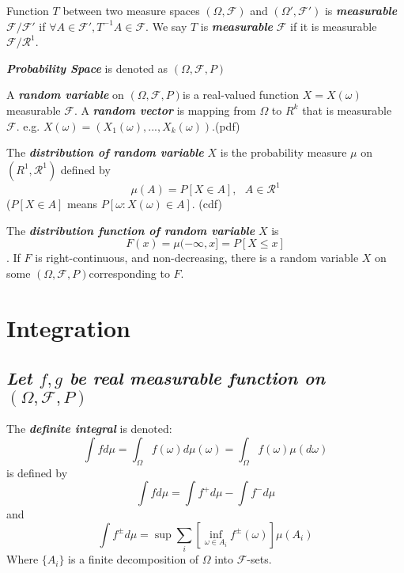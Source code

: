 \documentclass[10pt,twocolumn]{article}
\newenvironment{mydef}[1][Definition]{\begin{trivlist}
\item[\hskip \labelsep {\bfseries #1}]}{\end{trivlist}}
\newcommand{\probspace} {$(\Omega, \mathscr{F}, P)$}
\newcommand{\bt}[1]{\textbf{\textit{#1}}}
\begin{document}
\begin{mydef}
	Function $T$ between two measure spaces $(\Omega, \mathscr{F})$ and $(\Omega', \mathscr{F}')$ is \bt{measurable} $\mathscr{F}/\mathscr{F'}$ if $\forall A \in \mathscr{F}',  T^{-1}A \in \mathscr{F}$. We say $T$ is \bt{measurable} $\mathscr{F}$ if it is measurable $\mathscr{F}/\mathscr{R}^1$.
\end{mydef}

\begin{mydef}
\bt{Probability Space} is denoted as \probspace 
\end{mydef}

\begin{mydef}
 A \bt{random variable} on \probspace  is a real-valued function $X=X(\omega)$ measurable $\mathscr{F}$. A \bt{random vector} is mapping from $\Omega$ to $R^k$ that is measurable $\mathscr{F}$. e.g. $X(\omega) = (X_1(\omega),...,X_k(\omega))$.(pdf)
\end{mydef}

\begin{mydef}
	The \bt{distribution of random variable} $X$ is the probability measure $\mu$ on $(R^1, \mathscr{R}^1)$ defined by
	$$ \mu ( A) = P[X \in A], \ \ \ A\in \mathscr{R}^1$$ 
	($P[X\in A]$ means $P[\omega: X(\omega) \in A]$. (cdf)
\end{mydef}

\begin{mydef}
	The \bt{distribution function of random variable}  $X$ is $$ F(x) = \mu (-\infty, x] = P[X \leq x]$$. If $F$ is right-continuous, and non-decreasing, there is a random variable $X$ on some \probspace  corresponding to $F$.
\end{mydef}

\section*{Integration}
\subsection*{\textit{Let $f,g$ be real measurable function on \probspace}}
\begin{mydef}
	The \bt{definite integral} is denoted: $$ \int f d\mu = \int_\Omega f(\omega)d\mu (\omega) = \int_\Omega f(\omega) \mu (d\omega)$$ is defined by 
	$$\int f d\mu = \int f^+ d\mu - \int f^- d\mu$$
	and
	$$\int f^{\pm} d\mu = \sup \sum_i \left[\inf\limits_{\omega\in A_i} f^{\pm}(\omega ) \right] \mu (A_i)$$ Where $\{A_i\}$ is a finite decomposition of $\Omega$ into $\mathscr{F}$-sets.
\end{mydef}
\end{document}
